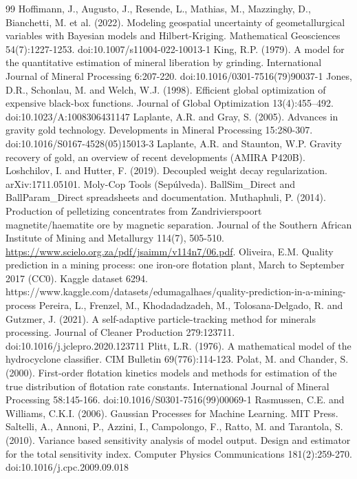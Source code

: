 \documentclass[10pt]{article}
\begin{document}
\begin{thebibliography}{99}
 Hoffimann, J., Augusto, J., Resende, L., Mathias, M., Mazzinghy, D., Bianchetti, M. et al. (2022). Modeling geospatial uncertainty of geometallurgical variables with Bayesian models and Hilbert-Kriging. Mathematical Geosciences 54(7):1227-1253. doi:10.1007/s11004-022-10013-1
 King, R.P. (1979). A model for the quantitative estimation of mineral liberation by grinding. International Journal of Mineral Processing 6:207-220. doi:10.1016/0301-7516(79)90037-1
 Jones, D.R., Schonlau, M. and Welch, W.J. (1998). Efficient global optimization of expensive black-box functions. Journal of Global Optimization 13(4):455--492. doi:10.1023/A:1008306431147
 Laplante, A.R. and Gray, S. (2005). Advances in gravity gold technology. Developments in Mineral Processing 15:280-307. doi:10.1016/S0167-4528(05)15013-3
 Laplante, A.R. and Staunton, W.P. Gravity recovery of gold, an overview of recent developments (AMIRA P420B).
 Loshchilov, I. and Hutter, F. (2019). Decoupled weight decay regularization. arXiv:1711.05101.
 Moly-Cop Tools (Sepúlveda). BallSim\_Direct and BallParam\_Direct spreadsheets and documentation.
 Muthaphuli, P. (2014). Production of pelletizing concentrates from Zandrivierspoort magnetite/haematite ore by magnetic separation. Journal of the Southern African Institute of Mining and Metallurgy 114(7), 505-510. \url{https://www.scielo.org.za/pdf/jsaimm/v114n7/06.pdf}.
 Oliveira, E.M. Quality prediction in a mining process: one iron-ore flotation plant, March to September 2017 (CC0). Kaggle dataset 6294. https://www.kaggle.com/datasets/edumagalhaes/quality-prediction-in-a-mining-process
 Pereira, L., Frenzel, M., Khodadadzadeh, M., Tolosana-Delgado, R. and Gutzmer, J. (2021). A self-adaptive particle-tracking method for minerals processing. Journal of Cleaner Production 279:123711. doi:10.1016/j.jclepro.2020.123711
 Plitt, L.R. (1976). A mathematical model of the hydrocyclone classifier. CIM Bulletin 69(776):114-123.
 Polat, M. and Chander, S. (2000). First-order flotation kinetics models and methods for estimation of the true distribution of flotation rate constants. International Journal of Mineral Processing 58:145-166. doi:10.1016/S0301-7516(99)00069-1
 Rasmussen, C.E. and Williams, C.K.I. (2006). Gaussian Processes for Machine Learning. MIT Press.
 Saltelli, A., Annoni, P., Azzini, I., Campolongo, F., Ratto, M. and Tarantola, S. (2010). Variance based sensitivity analysis of model output. Design and estimator for the total sensitivity index. Computer Physics Communications 181(2):259-270. doi:10.1016/j.cpc.2009.09.018

\end{thebibliography}
\end{document}
